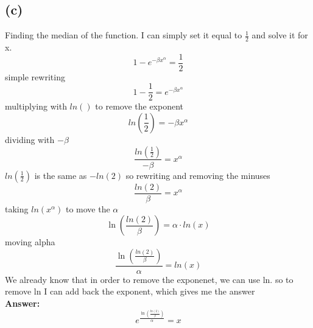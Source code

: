 \subsection{(c)}
Finding the median of the function. I can simply set it equal to $\frac{1}{2}$ and solve it for x.
$$1 - e^{- \beta x^{\alpha}} = \frac{1}{2}$$
simple rewriting
$$1 - \frac{1}{2} = e^{- \beta x^{\alpha}}$$
multiplying with $ln()$ to remove the exponent
$$ ln(\frac{1}{2}) = - \beta x^{\alpha} $$
dividing with $-\beta$
$$\frac{ln(\frac{1}{2})}{-\beta} = x^{\alpha} $$
$ln(\frac{1}{2})$ is the same as $-ln(2)$ so rewriting and removing the minuses
$$\frac{ln(2)}{\beta} = x^{\alpha} $$
taking $ln(x^{\alpha})$ to move the $\alpha$
$$\ln( \frac{ln(2)}{\beta} ) = \alpha \cdot ln(x) $$
moving alpha
$$\frac{\ln( \frac{ln(2)}{\beta} )}{\alpha} = ln(x)$$
We already know that in order to remove the exponenet, we can use ln. so to remove ln
I can add back the exponent, which gives me the answer
\\
\textbf{Answer:}
$$e^{\frac{\ln( \frac{ln(2)}{\beta} )}{\alpha}} = x$$